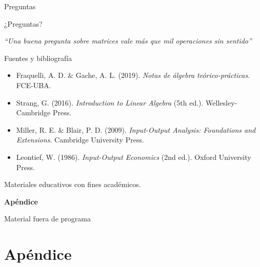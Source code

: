 \documentclass[aspectratio=169,10pt]{beamer}
\begin{document}
\begin{frame}{Preguntas}
\vspace{2cm}
\begin{center}
\Huge ¿Preguntas?
\end{center}
\vspace{1cm}
\begin{center}
\large
\textit{``Una buena pregunta sobre matrices vale más que mil operaciones sin sentido''}
\end{center}
\end{frame}

\begin{frame}{Fuentes y bibliografía}

\begin{itemize}
    \item Fraquelli, A. D. \& Gache, A. L. (2019). \textit{Notas de álgebra teórico-prácticas}. FCE-UBA.
    \item Strang, G. (2016). \textit{Introduction to Linear Algebra} (5th ed.). Wellesley-Cambridge Press.
    \item Miller, R. E. \& Blair, P. D. (2009). \textit{Input-Output Analysis: Foundations and Extensions}. Cambridge University Press.
    \item Leontief, W. (1986). \textit{Input-Output Economics} (2nd ed.). Oxford University Press.
\end{itemize}

\vspace{0.6cm}
\begin{center}
\small
Materiales educativos con fines académicos.
\end{center}
\end{frame}

\appendix

\begin{frame}[plain]
\begin{center}
\vspace{1.5cm}
\Huge \textbf{\color{violetaOscuro} Apéndice}

\vspace{0.5cm}
\Large Material fuera de programa
\end{center}
\end{frame}

\section{Apéndice}
\end{document}
